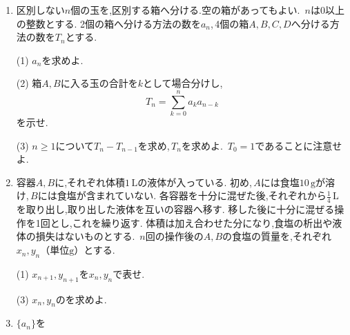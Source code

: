 \begin{enumerate}[label=\textbf{問\arabic*.},leftmargin=3.8em,format=\bookitemlink{practice-bridge}{problem}{answer}]
          \item 区別しない$\displaystyle n$個の玉を,区別する箱へ分ける.空の箱があってもよい.\,
                $\displaystyle n$は$\displaystyle 0$以上の整数とする.
                2個の箱へ分ける方法の数を$\displaystyle a_n$,\,4個の箱$\displaystyle A,B,C,D$へ分ける方法の数を$\displaystyle T_n$とする.
                \par\smallskip\noindent
                (1) $\displaystyle a_n$を求めよ.
                \par\smallskip\noindent
                (2) 箱$\displaystyle A,B$に入る玉の合計を$\displaystyle k$として場合分けし,
                \[
                  T_n=\sum_{k=0}^{n}a_ka_{n-k}
                \]
                を示せ.
                \par\smallskip\noindent
                (3) $\displaystyle n\ge1$について$\displaystyle T_n-T_{n-1}$を求め,\,$\displaystyle T_n$を求めよ.\,
                $\displaystyle T_0=1$であることに注意せよ.
          \item 容器$\displaystyle A,B$に,それぞれ体積$\displaystyle 1\,\mathrm{L}$の液体が入っている.
                初め,\,$\displaystyle A$には食塩$\displaystyle 10\,\mathrm{g}$が溶け,\,$\displaystyle B$には食塩が含まれていない.
                各容器を十分に混ぜた後,それぞれから$\displaystyle \frac14\,\mathrm{L}$を取り出し,取り出した液体を互いの容器へ移す.
                移した後に十分に混ぜる操作を1回とし,これを繰り返す.
                体積は加え合わせた分になり,食塩の析出や液体の損失はないものとする.\,
                $\displaystyle n$回の操作後の$\displaystyle A,B$の食塩の質量を,それぞれ$\displaystyle x_n,y_n$（単位$\displaystyle \mathrm{g}$）とする.
                \par\smallskip\noindent
                (1) $\displaystyle x_{n+1},y_{n+1}$を$\displaystyle x_n,y_n$で表せ.
                \par\smallskip\noindent
                \par\smallskip\noindent
                (3) $\displaystyle x_n,y_n$のを求めよ.
          \item {}$\displaystyle \{a_n\}$を

\end{enumerate}
